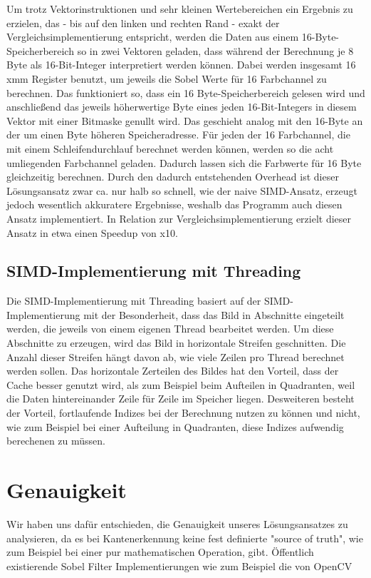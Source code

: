 \documentclass[course=erap]{aspdoc}
\begin{document}
Um trotz Vektorinstruktionen und sehr kleinen Wertebereichen ein Ergebnis zu erzielen,
das - bis auf den linken und rechten Rand - exakt der Vergleichsimplementierung entspricht,
werden die Daten aus einem 16-Byte-Speicherbereich so in zwei Vektoren geladen, dass während der Berechnung je 8 Byte
als 16-Bit-Integer interpretiert werden können.
Dabei werden insgesamt 16 xmm Register benutzt, um jeweils die Sobel Werte für 16 Farbchannel zu berechnen.
Das funktioniert so, dass ein 16 Byte-Speicherbereich gelesen wird und anschließend das jeweils höherwertige Byte eines jeden
16-Bit-Integers in diesem Vektor mit einer Bitmaske genullt wird. Das geschieht analog mit den 16-Byte an der um einen Byte höheren Speicheradresse.
Für jeden der 16 Farbchannel, die mit einem Schleifendurchlauf berechnet werden können, werden so die acht umliegenden
Farbchannel geladen. Dadurch lassen sich die Farbwerte für 16 Byte gleichzeitig berechnen. Durch den dadurch entstehenden Overhead
ist dieser Lösungsansatz zwar ca. nur halb so schnell, wie der naive SIMD-Ansatz, erzeugt jedoch wesentlich
akkuratere Ergebnisse, weshalb das Programm auch diesen Ansatz implementiert. In Relation zur Vergleichsimplementierung erzielt dieser
Ansatz in etwa einen Speedup von x10.

\subsection{SIMD-Implementierung mit Threading}
Die SIMD-Implementierung mit Threading basiert auf der SIMD-Implementierung mit der Besonderheit, dass das Bild in Abschnitte eingeteilt werden, die jeweils von einem eigenen Thread bearbeitet werden.
Um diese Abschnitte zu erzeugen, wird das Bild in horizontale Streifen geschnitten. Die Anzahl dieser Streifen hängt davon ab, wie viele Zeilen pro Thread berechnet werden sollen.
Das horizontale Zerteilen des Bildes hat den Vorteil, dass der Cache besser genutzt wird, als zum Beispiel beim Aufteilen in Quadranten, weil die Daten hintereinander Zeile für Zeile im Speicher liegen.
Desweiteren besteht der Vorteil, fortlaufende Indizes bei der Berechnung nutzen zu können und nicht, wie zum Beispiel bei einer Aufteilung in Quadranten, diese Indizes aufwendig berechenen zu müssen.

\section{Genauigkeit}
Wir haben uns dafür entschieden, die Genauigkeit unseres Lösungsansatzes zu analysieren, da es bei Kantenerkennung keine fest definierte "source of truth", wie zum Beispiel bei einer pur mathematischen Operation, gibt.
Öffentlich existierende Sobel Filter Implementierungen wie zum Beispiel die von OpenCV
\end{document}
